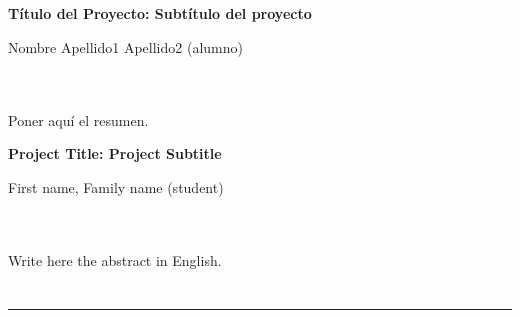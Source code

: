 \chapter*{}






\cleardoublepage
\thispagestyle{empty}

\begin{center}
{\large\bfseries Título del Proyecto: Subtítulo del proyecto}\\
\end{center}
\begin{center}
Nombre Apellido1 Apellido2 (alumno)\\
\end{center}

\\

\vspace{0.7cm}
\\

Poner aquí el resumen.
\cleardoublepage


\thispagestyle{empty}


\begin{center}
{\large\bfseries Project Title: Project Subtitle}\\
\end{center}
\begin{center}
First name, Family name (student)\\
\end{center}

\\

\vspace{0.7cm}
\\

Write here the abstract in English.

\chapter*{}
\thispagestyle{empty}

\noindent\rule[-1ex]{\textwidth}{2pt}\\[4.5ex]

